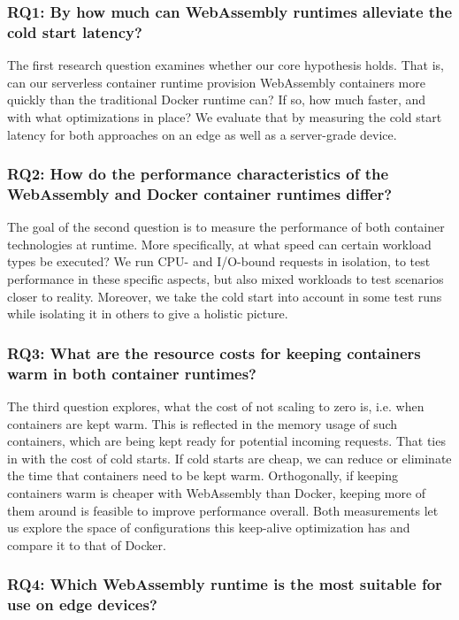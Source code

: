 \subsubsection*{RQ1: By how much can WebAssembly runtimes alleviate the cold start latency?}

The first research question examines whether our core hypothesis holds. That is, can our serverless container runtime provision WebAssembly containers more quickly than the traditional Docker runtime can? If so, how much faster, and with what optimizations in place? We evaluate that by measuring the cold start latency for both approaches on an edge as well as a server-grade device.

\subsubsection*{RQ2: How do the performance characteristics of the WebAssembly and Docker container runtimes differ?}

The goal of the second question is to measure the performance of both container technologies at runtime. More specifically, at what speed can certain workload types be executed? We run CPU- and I/O-bound requests in isolation, to test performance in these specific aspects, but also mixed workloads to test scenarios closer to reality. Moreover, we take the cold start into account in some test runs while isolating it in others to give a holistic picture.

\subsubsection*{RQ3: What are the resource costs for keeping containers warm in both container runtimes?}

The third question explores, what the cost of not scaling to zero is, i.e. when containers are kept warm. This is reflected in the memory usage of such containers, which are being kept ready for potential incoming requests. That ties in with the cost of cold starts. If cold starts are cheap, we can reduce or eliminate the time that containers need to be kept warm. Orthogonally, if keeping containers warm is cheaper with WebAssembly than Docker, keeping more of them around is feasible to improve performance overall. Both measurements let us explore the space of configurations this keep-alive optimization has and compare it to that of Docker.

\subsubsection*{RQ4: Which WebAssembly runtime is the most suitable for use on edge devices?}

